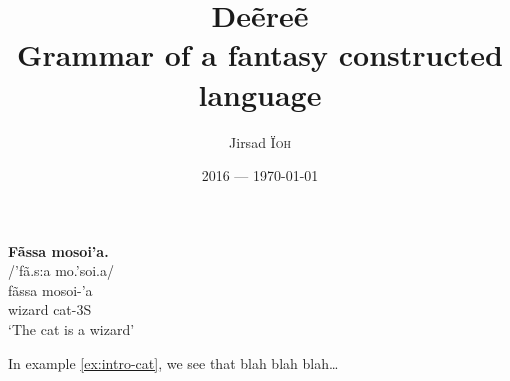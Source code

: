 \documentclass[a4paper, oneside]{book}
\title{Deẽreẽ\\Grammar of a fantasy constructed language}
\author{Jirsad \textsc{Ïoh}}
\date{2016 — \today}
\begin{document}
\frontmatter
\maketitle
\tableofcontents
{}
\begin{exe}
\ex\label{ex:intro-cat}
\textbf{Fãssa mosoi’a.}\\
/'fã.s:a mo.'soi.a/\\
\gll fãssa mosoi-’a\\
wizard cat-3S\\
\trans ‘The cat is a wizard’
\end{exe}

In example \ref{ex:intro-cat}, we see that blah blah blah…

\mainmatter
\label{chap:phonology}


\label{chap:morphology}


\label{chap:derivational-morphology}


\label{chap:conjugation}


\label{chap:syntax}


\backmatter
\clearpage\glsaddall
\begin{multicols}{2}\printglossaries\end{multicols}
\listoffigures{}
\listoftables{}
\listoftodos
\end{document}

